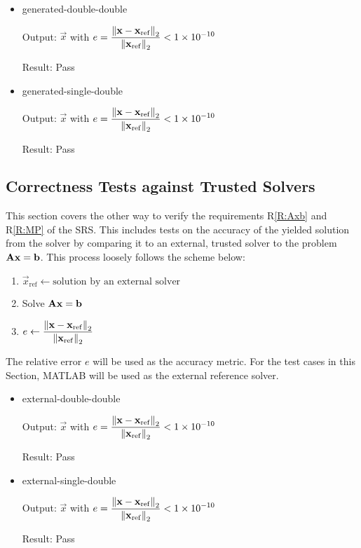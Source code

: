 \documentclass[12pt, titlepage]{article}
\newcommand{\rref}[1]{R\ref{#1}}
\newcommand{\tref}[1]{T\ref{#1}}
\begin{document}
\begin{itemize}

\item[\tref{T:gdd}:]{generated-double-double}

  Output: \(\vec{x}\) with \(e = \displaystyle \frac{\left\lVert\mathbf{x} -
      \mathbf{x}_\mathrm{ref}\right\rVert_2}{\left\lVert\mathbf{x}_\mathrm{ref}\right\rVert_2} < \num{1e-10}\)

  Result: Pass

\item[\tref{T:gsd}:]{generated-single-double}

  Output: \(\vec{x}\) with \(e = \displaystyle \frac{\left\lVert\mathbf{x} -
      \mathbf{x}_\mathrm{ref}\right\rVert_2}{\left\lVert\mathbf{x}_\mathrm{ref}\right\rVert_2} < \num{1e-10}\)

  Result: Pass

\end{itemize}

\subsection{Correctness Tests against Trusted Solvers}
\label{sec:corr-tests-against}

This section covers the other way to verify the requirements \rref{R:Axb} and
\rref{R:MP} of the SRS. This includes tests on the accuracy of the yielded
solution from the solver by comparing it to an external, trusted solver to the
problem \(\mathbf{A}\mathbf{x} = \mathbf{b}\). This process loosely follows the scheme
below:

\begin{enumerate}
\item \(\vec{x}_\mathrm{ref} \gets \text{solution by an external solver}\)
\item Solve \(\mathbf{A}\mathbf{x} = \mathbf{b}\)
\item \(e \gets \displaystyle \frac{\left\lVert\mathbf{x} - \mathbf{x}_\mathrm{ref}\right\rVert_2}{\left\lVert\mathbf{x}_\mathrm{ref}\right\rVert_2}\)
\end{enumerate}

The relative error \(e\) will be used as the accuracy metric. For the test cases
in this Section, MATLAB\textsuperscript{\textregistered} will be used as the
external reference solver.

\begin{itemize}

\item[\tref{T:exdd}:]{external-double-double}

  Output: \(\vec{x}\) with \(e = \displaystyle \frac{\left\lVert\mathbf{x} -
      \mathbf{x}_\mathrm{ref}\right\rVert_2}{\left\lVert\mathbf{x}_\mathrm{ref}\right\rVert_2} < \num{1e-10}\)

  Result: Pass

\item[\tref{T:exsd}:]{external-single-double}

  Output: \(\vec{x}\) with \(e = \displaystyle \frac{\left\lVert\mathbf{x} -
      \mathbf{x}_\mathrm{ref}\right\rVert_2}{\left\lVert\mathbf{x}_\mathrm{ref}\right\rVert_2} < \num{1e-10}\)

  Result: Pass

\end{itemize}
\end{document}
